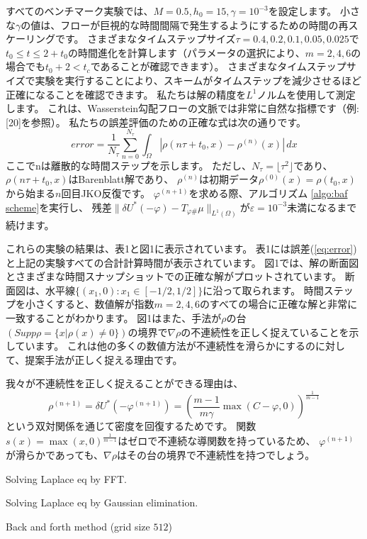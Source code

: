 \documentclass{jsarticle}
\theoremstyle{definition}
\begin{document}
{\color{red}
すべてのベンチマーク実験では、$M = 0.5, h_0 = 15, \gamma = 10^{-3}$を設定します。
}
小さな$\gamma$の値は、フローが巨視的な時間間隔で発生するようにするための時間の再スケーリングです。
さまざまなタイムステップサイズ$\tau = 0.4, 0.2, 0.1, 0.05, 0.025$で$t_0 \le t \le 2 + t_0$の時間進化を計算します（パラメータの選択により、$m = 2, 4, 6$の場合でも$t_0 + 2 < t_c$であることが確認できます）。
さまざまなタイムステップサイズで実験を実行することにより、スキームがタイムステップを減少させるほど正確になることを確認できます。
私たちは解の精度を$L^1$ノルムを使用して測定します。
これは、Wasserstein勾配フローの文脈では非常に自然な指標です（例:[20]を参照）。
私たちの誤差評価のための正確な式は次の通りです。
\begin{equation}
    \label{eq:error}
    error = \frac{1}{N_\tau} \sum_{n = 0}^{N_\tau} \int_\Omega |\rho(n \tau + t_0, x) - \rho^{(n)}(x)|\, dx
\end{equation}
ここでnは離散的な時間ステップを示します。
ただし、$N_\tau = \lfloor \tau^2 \rfloor$であり、$\rho(n\tau + t_0, x)$はBarenblatt解であり、
$\rho^{(n)}$は初期データ$\rho^{(0)}(x) = \rho(t_0, x)$から始まる$n$回目JKO反復です。
$\varphi^{(n+1)}$を求める際、アルゴリズム \ref{algo:baf scheme}を実行し、
残差$\|\delta U^*(- \varphi) - T_{\varphi \#} \mu \|_{L^1(\Omega)}$が$\varepsilon = 10^{-3}$未満になるまで続けます。

これらの実験の結果は、表1と図1に表示されています。
表1には誤差(\ref{eq:error})と上記の実験すべての合計計算時間が表示されています。
図1では、解の断面図とさまざまな時間スナップショットでの正確な解がプロットされています。
断面図は、水平線$\{(x_1, 0) : x_1 \in [-1/2, 1/2]\}$に沿って取られます。
時間ステップを小さくすると、数値解が指数$m = 2, 4, 6$のすべての場合に正確な解と非常に一致することがわかります。
図1はまた、手法が$\rho$の台$(Supp \rho = \{ x | \rho(x) \neq 0\})$の境界で$\nabla\rho$の不連続性を正しく捉えていることを示しています。
これは他の多くの数値方法が不連続性を滑らかにするのに対して、提案手法が正しく捉える理由です。

我々が不連続性を正しく捉えることができる理由は、
\[
    \rho^{(n+1)} = \delta U^*(- \varphi^{(n+1)}) = \left( \frac{m - 1}{m \gamma} \max(C - \varphi, 0)\right)^{\frac{1}{m-1}}
\]
という双対関係を通じて密度を回復するためです。
関数$s(x) = \max(x, 0)^{\frac{1}{m-1}}$はゼロで不連続な導関数を持っているため、
$\varphi^{(n+1)}$が滑らかであっても、$\nabla\rho$はその台の境界で不連続性を持つでしょう。


\begin{table}[hbtp]
    \centering
    \begin{subtable}{.5\textwidth}
        \centering
        \caption{Solving Laplace eq by FFT.}
        \label{table:baf_fft_test}
        
    \end{subtable}%
    \begin{subtable}{.5\textwidth}
        \centering
        \caption{Solving Laplace eq by Gaussian elimination.}
        \label{table:baf_gauss_test}
        
    \end{subtable}
    \caption{Back and forth method (grid size $512$)}
\end{table}
\end{document}
